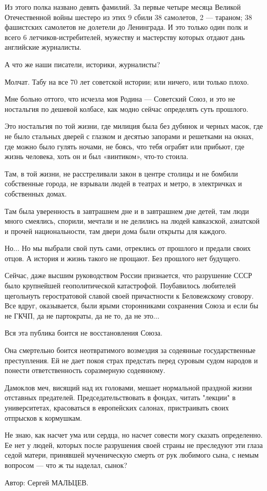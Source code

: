 Из этого полка названо девять фамилий. За первые четыре месяца Великой
Отечественной войны шестеро из этих 9 сбили 38 самолетов, 2 --- тараном; 38
фашистских самолетов не долетели до Ленинграда. И это только один полк и всего
6 летчиков-истребителей, мужеству и мастерству которых отдают дань английские
журналисты.

А что же наши писатели, историки, журналисты?

Молчат. Табу на все 70 лет советской истории; или ничего, или только плохо.

Мне больно оттого, что исчезла моя Родина --- Советский Союз, и это не ностальгия
по дешевой колбасе, как модно сейчас определять суть прошлого.

Это ностальгия по той жизни, где милиция была без дубинок и черных масок, где
не было стальных дверей с глазком и десятью запорами и решетками на окнах, где
можно было гулять ночами, не боясь, что тебя ограбят или прибьют, где жизнь
человека, хоть он и был «винтиком», что-то стоила.

Там, в той жизни, не расстреливали закон в центре столицы и не бомбили
собственные города, не взрывали людей в театрах и метро, в электричках и
собственных домах.

Там была уверенность в завтрашнем дне и в завтрашнем дне детей, там люди много
смеялись, спорили, мечтали и не делились на людей кавказской, азиатской и
прочей национальности, там двери дома были открыты для каждого.

Но... Но мы выбрали свой путь сами, отреклись от прошлого и предали своих
отцов. А история и жизнь такого не прощают. Без прошлого нет будущего.

Сейчас, даже высшим руководством России признается, что разрушение СССР было
крупнейшей геополитической катастрофой. Поубавилось любителей щегольнуть
геростратовой славой своей причастности к Беловежскому сговору. Все вдруг,
оказывается, были ярыми сторонниками сохранения Союза и если бы не ГКЧП, да не
партократы, да не то, да не это...

Вся эта публика боится не восстановления Союза.

Она смертельно боится неотвратимого возмездия за содеянные государственные
преступления. Ей не дает покоя страх предстать перед суровым судом народов и
понести ответственность соразмерную содеянному.

Дамоклов меч, висящий над их головами, мешает нормальной праздной жизни
отставных предателей. Председательствовать в фондах, читать "лекции" в
университетах, красоваться в европейских салонах, пристраивать своих отпрысков
к кормушкам.

Не знаю, как насчет ума или сердца, но насчет совести могу сказать определенно.
Ее нет у людей, которых после разрушения своей страны не преследуют эти глаза
седой матери, принявшей мученическую смерть от рук любимого сына, с немым
вопросом --- что ж ты наделал, сынок?

Автор: Сергей МАЛЬЦЕВ.



